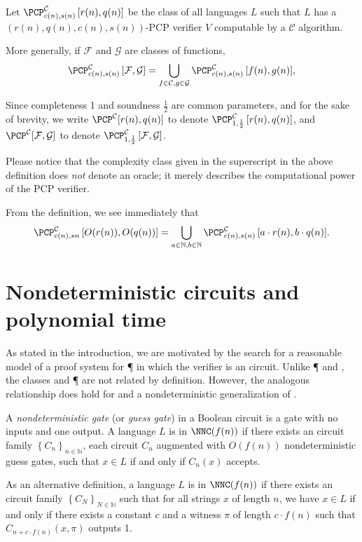 \documentclass{article}
\newcommand{\PCPcs}[5]{\PCP^{#1}_{#2, #3}\left[#4, #5\right]}
\begin{document}
\begin{definition}
  Let $\PCPcs{\mathcal{C}}{c(n)}{s(n)}{r(n)}{q(n)}$ be the class of all languages $L$ such that $L$ has a $(r(n), q(n), c(n), s(n))$-PCP verifier $V$ computable by a $\mathcal{C}$ algorithm.

  More generally, if $\mathcal{F}$ and $\mathcal{G}$ are classes of functions,
  \begin{equation*}
    \PCPcs{\mathcal{C}}{c(n)}{s(n)}{\mathcal{F}}{\mathcal{G}} = \bigcup_{f \in \mathcal{C}, g \in \mathcal{G}}{\PCPcs{\mathcal{C}}{c(n)}{s(n)}{f(n)}{g(n)}},
    \end{equation*}

  Since completeness 1 and soundness $\frac{1}{2}$ are common parameters, and for the sake of brevity, we write $\PCP^{\mathcal{C}}[r(n), q(n)]$ to denote $\PCPcs{\mathcal{C}}{1}{\frac{1}{2}}{r(n)}{q(n)}$, and $\PCP^{\mathcal{C}}[\mathcal{F}, \mathcal{G}]$ to denote $\PCPcs{\mathcal{C}}{1}{\frac{1}{2}}{\mathcal{F}}{\mathcal{G}}$.
\end{definition}

Please notice that the complexity class given in the superscript in the above definition does \emph{not} denote an oracle; it merely describes the computational power of the PCP verifier.

From the definition, we see immediately that
\begin{equation*}
  \PCPcs{\mathcal{C}}{c(n)}{s{n}}{O(r(n))}{O(q(n))} = \bigcup_{a \in \mathbb{N}, b \in \mathbb{N}}{\PCPcs{\mathcal{C}}{c(n)}{s(n)}{a \cdot r(n)}{b \cdot q(n)}}.
\end{equation*}

\section{Nondeterministic \texorpdfstring{\NC}{NC} circuits and polynomial time}\label{sec:nnc}

As stated in the introduction, we are motivated by the search for a reasonable model of a proof system for \P{} in which the verifier is an \NC{} circuit.
Unlike \P{} and \NP{}, the classes \NC{} and \P{} are not related by definition.
However, the analogous relationship does hold for \NC{} and a nondeterministic generalization of \NC{}.
\begin{definition}
  A \emph{nondeterministic gate} (or \emph{guess gate}) in a Boolean circuit is a gate with no inputs and one output.
  A language $L$ is in $\NNC(f(n))$ if there exists an \NC{} circuit family $\left\{C_n\right\}_{n \in \mathbb{N}}$, each circuit $C_n$ augmented with $O(f(n))$ nondeterministic guess gates, such that $x \in L$ if and only if $C_n(x)$ accepts.

  As an alternative definition, a language $L$ is in $\NNC(f(n))$ if there exists an \NC{} circuit family $\left\{C_N\right\}_{N \in \mathbb{N}}$ such that for all strings $x$ of length $n$, we have $x \in L$ if and only if there exists a constant $c$ and a witness $\pi$ of length $c \cdot f(n)$ such that $C_{n + c \cdot f(n)}(x, \pi)$ outputs 1.
\end{definition}
\end{document}
